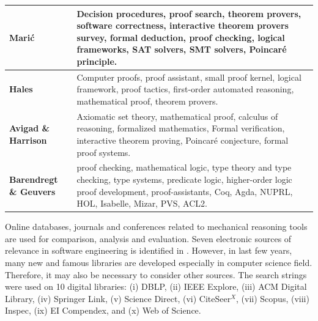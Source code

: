 \begin{table}[!ht]
\begin{tabular}{|p{1.2cm}|p{6.6cm}|}
  \textbf{Mari\'{c}} & Decision procedures, proof search, theorem provers, software correctness, interactive theorem provers survey, formal deduction, 
                    proof checking, logical frameworks, SAT solvers, SMT solvers, Poincar{\'e} principle. \\       \hline
\textbf{Hales} & Computer proofs, proof assistant, small proof kernel, logical framework, proof tactics, first-order automated 
                           reasoning, mathematical proof, theorem provers. \\       \hline
\textbf{Avigad \& Harrison} & Axiomatic set theory, mathematical proof, calculus of reasoning, formalized mathematics, 
                                Formal verification, interactive theorem proving, Poincar{\'e} conjecture, formal proof systems. \\       \hline
\textbf{Barendregt \& Geuvers} & proof checking, mathematical logic, type theory and type checking, type systems, predicate logic, higher-order logic
                                proof development, proof-assistants, Coq, Agda, NUPRL, HOL, Isabelle, Mizar, PVS, ACL2. \\       \hline                          
\end{tabular}
\label{modeltools55}
\end{table}
Online databases, journals and conferences related to mechanical reasoning tools are used for comparison, analysis and evaluation. 
Seven electronic sources of relevance in software engineering is identified in .
However, in last few years, many new and famous libraries are developed especially in computer science field. Therefore,
it may also be necessary to consider other sources. The search strings were used on 10 digital libraries: 
 (i) DBLP, (ii) IEEE Explore, (iii) ACM Digital Library, (iv) Springer Link, (v) Science Direct, (vi) CiteSeer$^{X}$, (vii) Scopus, (viii) Inspec, 
 (ix) EI Compendex, and (x) Web of Science.

